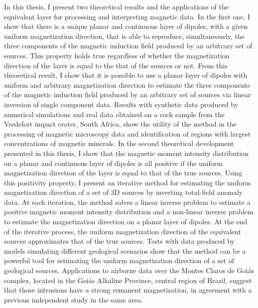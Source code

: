 \begin{foreignabstract}

In this thesis, I present two theoretical results and the applications of the 
equivalent layer for processing and interpreting magnetic data.
In the first one, I show that there is a unique planar and continuous layer of dipoles,
with a given uniform magnetization direction, that is able to reproduce, simultaneously,
the three components of the magnetic induction field produced by an arbitrary set of 
sources. This property holds true regardless of whether the magnetization direction of 
the layer is equal to the that of the sources or not.
From this theoretical result, I show that it is possible to use a planar layer of dipoles 
with uniform and arbitrary magnetization direction to estimate the three components of the 
magnetic induction field produced by an arbitrary set of sources via linear inversion
of single component data. 
Results with synthetic data produced by numerical simulations and real data obtained 
on a rock sample from the Vredefort impact crater, South Africa, show the utility of the method
in the processing of magnetic microscopy data and identification of regions with largest 
concentrations of magnetic minerals.
In the second theoretical development presented in this thesis, I show that the magnetic 
moment intensity distribution on a planar and continuous layer of dipoles is all positive 
if the uniform magnetization direction of the layer is equal to that of the true sources.
Using this positivity property, I present an iterative method for estimating the uniform 
magnetization direction of a set of 3D sources by inverting total-field anomaly data.
At each iteration, the method solves a linear inverse problem to estimate a positive magnetic 
moment intensity distribution and a non-linear inverse problem to estimate the magnetization 
direction on a planar layer of dipoles. At the end of the iterative process, the uniform 
magnetization direction of the equivalent sources approximates that of the true sources.
Tests with data produced by models simulating different geological scenarios show that the method 
can be a powerful tool for estimating the uniform magnetization direction of a set of geological 
sources. Applications to airborne data over the Montes Claros de Goiás complex, located in the 
Goiás Alkaline Province, central region of Brazil, suggest that those intrusions have a strong 
remanent magnetization, in agreement with a previous independent study in the same area.

\end{foreignabstract}